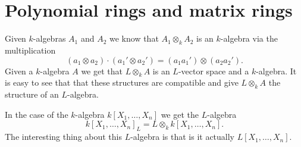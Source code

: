\section{Polynomial rings and matrix rings}
Given $k$-algebras $A_1$ and $A_2$ we know that $A_1 \otimes_k A_2$ is an $k$-algebra via the multiplication
\[
 (a_1 \otimes a_2) \cdot (a_1' \otimes a_2') = (a_1 a_1') \otimes (a_2 a_2').
\]
Given a $k$-algebra $A$ we get that $L \otimes_k A$ is an $L$-vector space and a $k$-algebra. It is easy to see that that these structures are compatible and give $L \otimes_k A$ the structure of an $L$-algebra.

In the case of the $k$-algebra $k[X_1, \dotsc, X_n]$ we get the $L$-algebra
\[
 k[X_1, \dotsc, X_n]_L = L \otimes_k k[X_1, \dotsc, X_n].
\]
The interesting thing about this $L$-algebra is that is it actually $L[X_1, \ldots, X_n]$.


